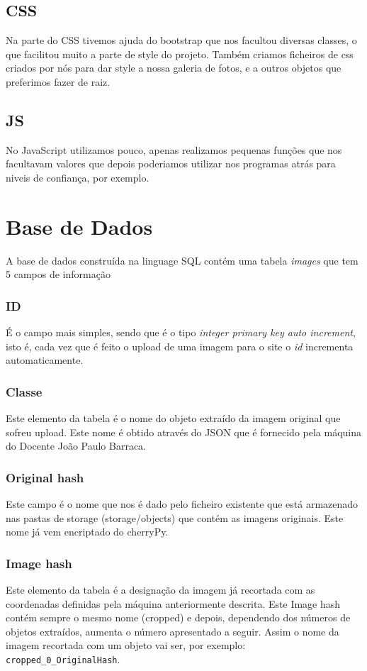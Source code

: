 \documentclass{report}
\begin{document}
\section{CSS}
Na parte do CSS tivemos ajuda do bootstrap que nos facultou diversas classes, o que facilitou muito a parte de style do projeto. Também criamos ficheiros de css criados por nós para dar style a nossa galeria de fotos, e a outros objetos que preferimos fazer de raiz.

\section{JS}
No JavaScript utilizamos pouco, apenas realizamos pequenas funções que nos facultavam valores que depois poderiamos utilizar nos programas atrás para niveis de confiança, por exemplo.

\chapter{Base de Dados}
\label{chap.resultados}
A base de dados construída na linguage SQL contém uma tabela \textit{images} que tem 5 campos de informação
\subsection{ID}
É o campo mais simples, sendo que é o tipo \textit{integer primary key auto increment}, isto é, cada vez que é feito o upload de uma imagem para o site o \textit{id} incrementa automaticamente.
\subsection{Classe}
Este elemento da tabela é o nome do objeto extraído da imagem original que sofreu upload. Este nome é obtido através do JSON que é fornecido pela máquina do Docente João Paulo Barraca.
\subsection{Original hash}
Este campo é o nome que nos é dado pelo ficheiro existente que está armazenado nas pastas de storage (storage/objects) que contém as imagens originais. Este nome já vem encriptado do cherryPy.
\subsection{Image hash}
Este elemento da tabela é a designação da imagem já recortada com as coordenadas definidas pela máquina anteriormente descrita. Este Image hash contém sempre o mesmo nome (cropped) e depois, dependendo dos números de objetos extraídos, aumenta o número apresentado a seguir. Assim o nome da imagem recortada com um objeto vai ser, por exemplo: \texttt{cropped\_0\_OriginalHash}.
\end{document}
